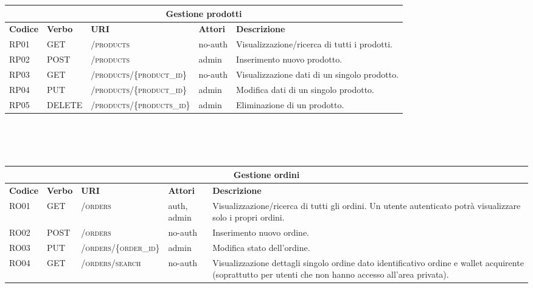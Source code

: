 \hspace*{-2cm}
\begin{tabular}{ |p{1.2cm}|p{1.5cm}|p{5cm}|p{2cm}|p{6cm}| }
    \hline
    \multicolumn{5}{|c|}{\textbf{Gestione prodotti}}\\
    \hline
    \hline
    \textbf{Codice} & \textbf{Verbo} & \textbf{URI} & \textbf{Attori} & \textbf{Descrizione}\\
    \hline
    RP01 & GET & \textsc{/products} & no-auth & Visualizzazione/ricerca di tutti i prodotti.\\
    \hline
    RP02 & POST & \textsc{/products} & admin & Inserimento nuovo prodotto.\\
    \hline
    RP03 & GET & \textsc{/products/\{product\_id\}} & no-auth & Visualizzazione dati di un singolo prodotto.\\
    \hline
    RP04 & PUT & \textsc{/products/\{product\_id\}} & admin & Modifica dati di un singolo prodotto.\\
    \hline
    RP05 & DELETE & \textsc{/products/\{products\_id\}} & admin & Eliminazione di un prodotto.\\
    \hline
\end{tabular}
\\\\\\
\hspace*{-2cm}
\begin{tabular}{ |p{1.2cm}|p{1.5cm}|p{5cm}|p{2cm}|p{6cm}| }
    \hline
    \multicolumn{5}{|c|}{\textbf{Gestione ordini}}\\
    \hline
    \hline
    \textbf{Codice} & \textbf{Verbo} & \textbf{URI} & \textbf{Attori} & \textbf{Descrizione}\\
    \hline
    RO01 & GET & \textsc{/orders} & auth, admin & Visualizzazione/ricerca di tutti gli ordini. Un utente autenticato potrà visualizzare solo i propri ordini.\\
    \hline
    RO02 & POST & \textsc{/orders} & no-auth & Inserimento nuovo ordine.\\
    \hline
    RO03 & PUT & \textsc{/orders/\{order\_id\}} & admin & Modifica stato dell'ordine.\\
    \hline
    RO04 & GET & \textsc{/orders/search} & no-auth & Visualizzazione dettagli singolo ordine dato identificativo ordine e wallet acquirente (soprattutto per utenti che non hanno accesso all'area privata).\\
    \hline
\end{tabular}
\\\\\\

